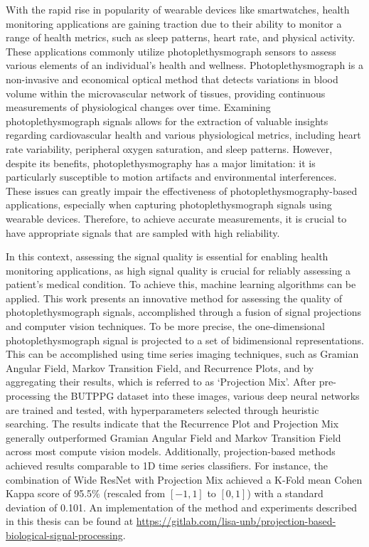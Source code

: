 

With the rapid rise in popularity of wearable devices like smartwatches, health monitoring applications are gaining traction due to their ability to monitor a range of health metrics, such as sleep patterns, heart rate, and physical activity. These applications commonly utilize photoplethysmograph sensors to assess various elements of an individual's health and wellness. Photoplethysmograph is a non-invasive and economical optical method that detects variations in blood volume within the microvascular network of tissues, providing continuous measurements of physiological changes over time. Examining photoplethysmograph signals allows for the extraction of valuable insights regarding cardiovascular health and various physiological metrics, including heart rate variability, peripheral oxygen saturation, and sleep patterns. However, despite its benefits, photoplethysmography has a major limitation: it is particularly susceptible to motion artifacts and environmental interferences. These issues can greatly impair the effectiveness of photoplethysmography-based applications, especially when capturing photoplethysmograph signals using wearable devices. Therefore, to achieve accurate measurements, it is crucial to have appropriate signals that are sampled with high reliability.

In this context, assessing the signal quality is essential for enabling health monitoring applications, as high signal quality is crucial for reliably assessing a patient’s medical condition. To achieve this, machine learning algorithms can be applied. This work presents an innovative method for assessing the quality of photoplethysmograph signals, accomplished through a fusion of signal projections and computer vision techniques. To be more precise, the one-dimensional photoplethysmograph signal is projected to a set of bidimensional representations. This can be accomplished using time series imaging techniques, such as Gramian Angular Field, Markov Transition Field, and Recurrence Plots, and by aggregating their results, which is referred to as `Projection Mix'. After pre-processing the \gls{BUTPPG} dataset into these images, various deep neural networks are trained and tested, with hyperparameters selected through heuristic searching. The results indicate that the Recurrence Plot and Projection Mix generally outperformed Gramian Angular Field and Markov Transition Field across most compute vision models. Additionally, projection-based methods achieved results comparable to 1D time series classifiers. For instance, the combination of Wide ResNet with Projection Mix achieved a K-Fold mean Cohen Kappa score of 95.5\% (rescaled from $[-1,1]$ to $[0,1]$) with a standard deviation of 0.101. An implementation of the method and experiments described in this thesis can be found at \url{https://gitlab.com/lisa-unb/projection-based-biological-signal-processing}.
